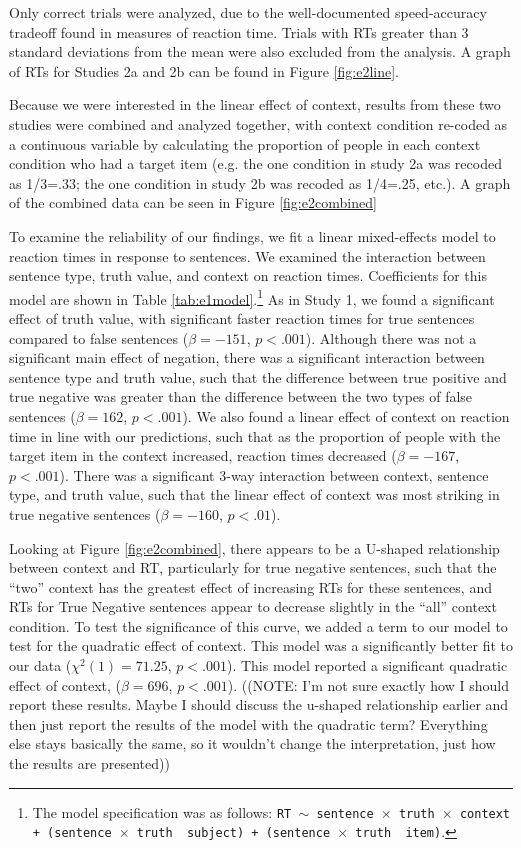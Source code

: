 \documentclass[10pt,letterpaper]{article}
\begin{document}
Only correct trials were analyzed, due to the well-documented speed-accuracy tradeoff found in measures of reaction time.  Trials with RTs greater than 3 standard deviations from the mean were also excluded from the analysis.  A graph of RTs for Studies 2a and 2b can be found in Figure \ref{fig:e2line}.  

Because we were interested in the linear effect of context, results from these two studies were combined and analyzed together, with context condition re-coded as a continuous variable by calculating the proportion of people in each context condition who had a target item (e.g. the one condition in study 2a was recoded as 1/3=.33; the one condition in study 2b was recoded as 1/4=.25, etc.).  A graph of the combined data can be seen in Figure \ref{fig:e2combined}

To examine the reliability of our findings, we fit a linear mixed-effects model to reaction times in response to sentences.  We examined the interaction between sentence type, truth value, and context on reaction times.    Coefficients for this model are shown in Table \ref{tab:e1model}.\footnote{The model specification was as follows: \texttt{RT $\sim$ sentence~$\times$~truth~$\times$~context + (sentence~$\times$~truth~\textbar~subject) +  (sentence~$\times$~truth~\textbar~item)}.}  As in Study 1, we found a significant effect of truth value, with significant faster reaction times for true sentences compared to false sentences ($\beta= -151$, $p< .001$).  Although there was not a significant main effect of negation, there was a significant interaction between sentence type and truth value, such that the difference between true positive and true negative was greater than the difference between the two types of false sentences ($\beta= 162$, $p< .001$).  We also found a linear effect of context on reaction time in line with our predictions, such that as the proportion of people with the target item in the context increased, reaction times decreased ($\beta= -167$, $p< .001$).   There was a significant 3-way interaction between context, sentence type, and truth value, such that the linear effect of context was most striking in true negative sentences ($\beta= -160$, $p< .01$).

Looking at Figure \ref{fig:e2combined}, there appears to be a U-shaped relationship between context and RT, particularly for true negative sentences, such that the ``two'' context has the greatest effect of increasing RTs for these sentences, and RTs for True Negative sentences appear to decrease slightly in the ``all'' context condition.  To test the significance of this curve, we added a term to our model to test for the quadratic effect of context.  This model was a significantly better fit to our data ($\chi^{2}(1) = 71.25$, $p<.001$).  This model reported a significant quadratic effect of context,  ($\beta= 696 $, $p< .001$).  ((NOTE: I'm not sure exactly how I should report these results.  Maybe I should discuss the u-shaped relationship earlier and then just report the results of the model with the quadratic term?  Everything else stays basically the same, so it wouldn't change the interpretation, just how the results are presented))
\end{document}
